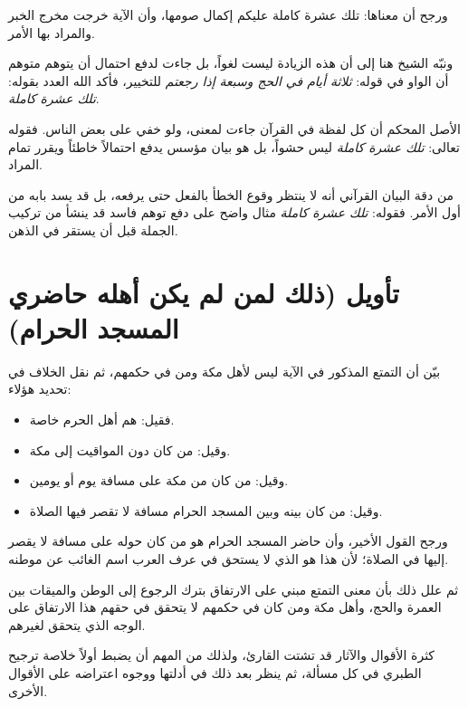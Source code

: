ورجح  أن معناها: تلك عشرة كاملة عليكم إكمال صومها، وأن الآية خرجت مخرج الخبر والمراد بها الأمر.

ونبّه الشيخ هنا إلى أن هذه الزيادة ليست لغواً، بل جاءت لدفع احتمال أن يتوهم متوهم أن الواو في قوله: \textit{ثلاثة أيام في الحج وسبعة إذا رجعتم} للتخيير، فأكد الله العدد بقوله: \textit{تلك عشرة كاملة}.

\begin{fawaid}
الأصل المحكم أن كل لفظة في القرآن جاءت لمعنى، ولو خفي على بعض الناس. فقوله تعالى: \textit{تلك عشرة كاملة} ليس حشواً، بل هو بيان مؤسس يدفع احتمالاً خاطئاً ويقرر تمام المراد.
\end{fawaid}

\begin{fawaid}
من دقة البيان القرآني أنه لا ينتظر وقوع الخطأ بالفعل حتى يرفعه، بل قد يسد بابه من أول الأمر. فقوله: \textit{تلك عشرة كاملة} مثال واضح على دفع توهم فاسد قد ينشأ من تركيب الجملة قبل أن يستقر في الذهن.
\end{fawaid}

\separator

\section{تأويل (ذلك لمن لم يكن أهله حاضري المسجد الحرام)}
بيّن  أن التمتع المذكور في الآية ليس لأهل مكة ومن في حكمهم، ثم نقل الخلاف في تحديد هؤلاء:
\begin{itemize}
    \item فقيل: هم أهل الحرم خاصة.
    \item وقيل: من كان دون المواقيت إلى مكة.
    \item وقيل: من كان من مكة على مسافة يوم أو يومين.
    \item وقيل: من كان بينه وبين المسجد الحرام مسافة لا تقصر فيها الصلاة.
\end{itemize}

ورجح  القول الأخير، وأن حاضر المسجد الحرام هو من كان حوله على مسافة لا يقصر إليها في الصلاة؛ لأن هذا هو الذي لا يستحق في عرف العرب اسم الغائب عن موطنه.

ثم علل ذلك بأن معنى التمتع مبني على الارتفاق بترك الرجوع إلى الوطن والميقات بين العمرة والحج، وأهل مكة ومن كان في حكمهم لا يتحقق في حقهم هذا الارتفاق على الوجه الذي يتحقق لغيرهم.

\begin{fawaid}
كثرة الأقوال والآثار قد تشتت القارئ، ولذلك من المهم أن يضبط أولاً خلاصة ترجيح الطبري في كل مسألة، ثم ينظر بعد ذلك في أدلتها ووجوه اعتراضه على الأقوال الأخرى.
\end{fawaid}

